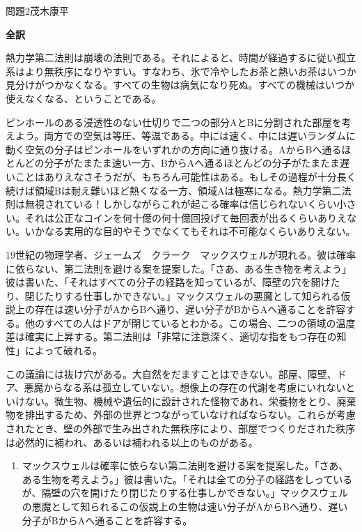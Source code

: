 \documentclass[fleqn]{jbook}
\begin{document}
\begin{answer}{問題2}{茂木康平}
\setcounter{equation}{0}

{\bf \noindent 全訳}

{\parindent=10pt
熱力学第二法則は崩壊の法則である。それによると、時間が経過するに従い孤立系はより無秩序になりやすい。すなわち、氷で冷やしたお茶と熱いお茶はいつか見分けがつかなくなる。すべての生物は病気になり死ぬ。すべての機械はいつか使えなくなる、ということである。

ピンホールのある浸透性のない仕切りで二つの部分AとBに分割された部屋を考えよう。両方での空気は等圧、等温である。中には速く、中には遅いランダムに動く空気の分子はピンホールをいずれかの方向に通り抜ける。AからBへ通るほとんどの分子がたまたま速い一方、BからAへ通るほとんどの分子がたまたま遅いことはありえなさそうだが、もちろん可能性はある。もしその過程が十分長く続けば領域Bは耐え難いほど熱くなる一方、領域Aは極寒になる。熱力学第二法則は無視されている！しかしながらこれが起こる確率は信じられないくらい小さい。それは公正なコインを何十億の何十億回投げて毎回表が出るくらいありえない。いかなる実用的な目的やそうでなくてもそれは不可能なくらいありえない。

19世紀の物理学者、ジェームズ　クラーク　マックスウェルが現れる。彼は確率に依らない、第二法則を避ける案を提案した。「さあ、ある生き物を考えよう」彼は書いた、「それはすべての分子の経路を知っているが、障壁の穴を開けたり、閉じたりする仕事しかできない。」マックスウェルの悪魔として知られる仮説上の存在は速い分子がAからBへ通り、遅い分子がBからAへ通ることを許容する。他のすべての人はドアが閉じているとわかる。この場合、二つの領域の温度差は確実に上昇する。第二法則は「非常に注意深く、適切な指をもつ存在の知性」によって破れる。

この議論には抜け穴がある。大自然をだますことはできない。部屋、障壁、ドア、悪魔からなる系は孤立していない。想像上の存在の代謝を考慮にいれないといけない。微生物、機械や遺伝的に設計された怪物であれ、栄養物をとり、廃棄物を排出するため、外部の世界とつながっていなければならない。これらが考慮されたとき、壁の外部で生み出された無秩序により、部屋でつくりだされた秩序は必然的に補われ、あるいは補われる以上のものがある。
}

\begin{enumerate}
    \item マックスウェルは確率に依らない第二法則を避ける案を提案した。「さあ、ある生物を考えよう。」彼は書いた。「それは全ての分子の経路をしっているが、隔壁の穴を開けたり閉じたりする仕事しかできない。」マックスウェルの悪魔として知られるこの仮説上の生物は速い分子がAからBへ通り、遅い分子がBからAへ通ることを許容する。


\end{enumerate}
\end{answer}
\end{document}
